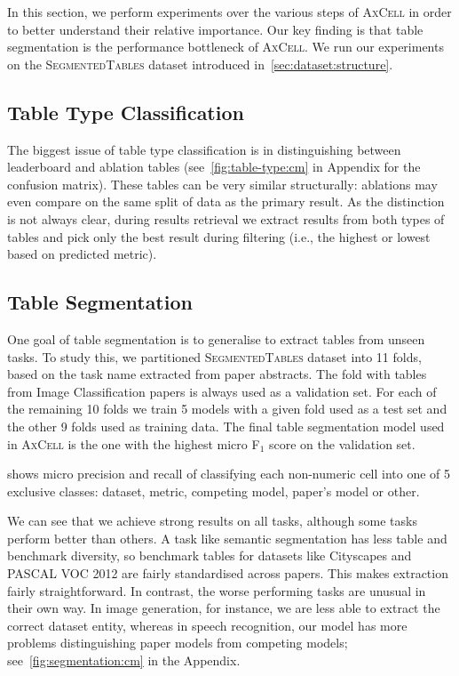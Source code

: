 \documentclass[11pt,a4paper]{article}
\newcommand{\model}{\textsc{AxCell}}
\newcommand{\finegrained}{\textsc{SegmentedTables}}
\begin{document}
In this section, we perform experiments over the various steps of \model{} in order to better understand their relative importance. Our key finding is that table segmentation is the performance bottleneck of \model{}. We run our experiments on the \finegrained{} dataset introduced in~\cref{sec:dataset:structure}.

\subsection{Table Type Classification}
\label{sec:ablation:table-type}

The biggest issue of table type classification is in distinguishing between leaderboard and ablation tables (see~\cref{fig:table-type:cm} in Appendix for the confusion matrix). These tables can be very similar structurally: ablations may even compare on the same split of data as the primary result. As the distinction is not always clear, during results retrieval we extract results from both types of tables and pick only the best result during filtering (i.e., the highest or lowest based on predicted metric).


\subsection{Table Segmentation}
\label{sec:results:structure-prediction}

One goal of table segmentation is to generalise to extract tables from unseen tasks. To study this, we partitioned \finegrained{} dataset into 11 folds, based on the task name extracted from paper abstracts. The fold with tables from Image Classification papers is always used as a validation set. For each of the remaining 10 folds we train 5 models with a given fold used as a test set and the other 9 folds used as training data. The final table segmentation model used in \model{} is the one with the highest micro F$_1$ score on the validation set.

 shows micro precision and recall of classifying each non-numeric cell into one of 5 exclusive classes: dataset, metric, competing model, paper’s model or other.

We can see that we achieve strong results on all tasks, although some tasks perform better than others. A task like semantic segmentation has less table and benchmark diversity, so benchmark tables for datasets like Cityscapes and PASCAL VOC 2012 are fairly standardised across papers. This makes extraction fairly straightforward. In contrast, the worse performing tasks are unusual in their own way. In image generation, for instance, we are less able to extract the correct dataset entity, whereas in speech recognition, our model has more problems distinguishing paper models from competing models; see~\cref{fig:segmentation:cm} in the Appendix.
\end{document}
